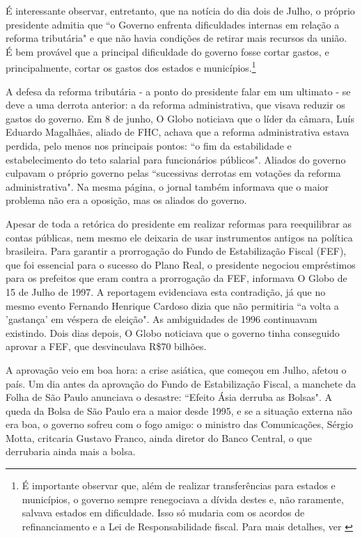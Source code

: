 \documentclass{article}
\begin{document}
É interessante observar, entretanto, que na notícia do dia dois de Julho, o próprio presidente admitia que ``o Governo enfrenta dificuldades internas em relação a reforma tributária" e que não havia condições de retirar mais recursos da união. É bem provável que a principal dificuldade do governo fosse cortar gastos, e principalmente, cortar os gastos dos estados e municípios.\footnote{É importante observar que, além de realizar transferências para estados e municípios, o governo sempre renegociava a dívida destes e, não raramente, salvava estados em dificuldade. Isso só mudaria com os acordos de refinanciamento e a Lei de Responsabilidade fiscal. Para mais detalhes, ver \citet{Giambiagi2002}}

A defesa da reforma tributária - a ponto do presidente falar em um ultimato - se deve a uma derrota anterior: a da reforma administrativa, que visava reduzir os gastos do governo. Em 8 de junho, O Globo noticiava que o líder da câmara, Luís Eduardo Magalhães, aliado de FHC, achava que a reforma administrativa estava perdida, pelo menos nos principais pontos: ``o fim da estabilidade e estabelecimento do teto salarial para funcionários públicos". Aliados do governo culpavam o próprio governo pelas ``sucessivas derrotas em votações da reforma administrativa". Na mesma página, o jornal também informava que o maior problema não era a oposição, mas os aliados do governo. 

Apesar de toda a retórica do presidente em realizar reformas para reequilibrar as contas públicas, nem mesmo ele deixaria de usar instrumentos antigos na política brasileira. Para garantir a prorrogação do Fundo de Estabilização Fiscal (FEF), que foi essencial para o sucesso do Plano Real, o presidente negociou empréstimos para os prefeitos que eram contra a prorrogação da FEF, informava O Globo de 15 de Julho de 1997. A reportagem evidenciava esta contradição, já que no mesmo evento Fernando Henrique Cardoso dizia que não permitiria ``a volta a 'gastança' em véspera de eleição". As ambiguidades de 1996 continuavam existindo. Dois dias depois, O Globo noticiava que o governo tinha conseguido aprovar a FEF, que desvinculava R\$70 bilhões. 

A aprovação veio em boa hora: a crise asiática, que começou em Julho, afetou o país. Um dia antes da aprovação do Fundo de Estabilização Fiscal, a manchete da Folha de São Paulo anunciava o desastre: ``Efeito Ásia derruba as Bolsas". A queda da Bolsa de São Paulo era a maior desde 1995, e se a situação externa não era boa, o governo sofreu com o fogo amigo: o ministro das Comunicações, Sérgio Motta, critcaria Gustavo Franco, ainda diretor do Banco Central, o que derrubaria ainda mais a bolsa. 
\end{document}
